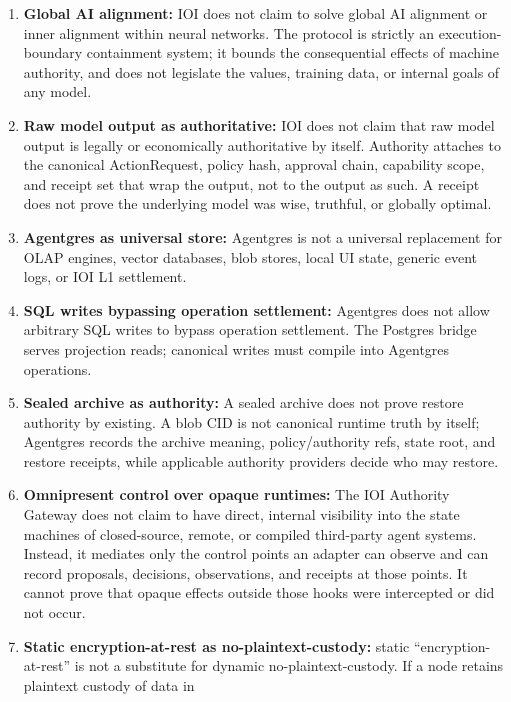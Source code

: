 \documentclass[
  11pt,
]{article}
\begin{document}
\begin{enumerate}
  misuse, or legal discovery risk. IOI's claim is narrower: the action's
  evidence posture, leakage bounds, and verifier requirements are
  explicit, auditable, and settlement-bound.
\item
  \textbf{Global AI alignment:} IOI does not claim to solve global AI
  alignment or inner alignment within neural networks. The protocol is
  strictly an execution-boundary containment system; it bounds the
  consequential effects of machine authority, and does not legislate the
  values, training data, or internal goals of any model.
\item
  \textbf{Raw model output as authoritative:} IOI does not claim that
  raw model output is legally or economically authoritative by itself.
  Authority attaches to the canonical ActionRequest, policy hash,
  approval chain, capability scope, and receipt set that wrap the
  output, not to the output as such. A receipt does not prove the
  underlying model was wise, truthful, or globally optimal.
\item
  \textbf{Agentgres as universal store:} Agentgres is not a universal
  replacement for OLAP engines, vector databases, blob stores, local UI
  state, generic event logs, or IOI L1 settlement.
\item
  \textbf{SQL writes bypassing operation settlement:} Agentgres does not
  allow arbitrary SQL writes to bypass operation settlement. The
  Postgres bridge serves projection reads; canonical writes must compile
  into Agentgres operations.
\item
  \textbf{Sealed archive as authority:} A sealed archive does not prove
  restore authority by existing. A blob CID is not canonical runtime
  truth by itself; Agentgres records the archive meaning, policy/authority
  refs, state root, and restore receipts, while applicable authority
  providers decide who may restore.
\item
  \textbf{Omnipresent control over opaque runtimes:} The IOI Authority
  Gateway does not claim to have direct, internal visibility into the
  state machines of closed-source, remote, or compiled third-party agent
  systems. Instead, it mediates only the control points an adapter can
  observe and can record proposals, decisions, observations, and receipts at
  those points. It cannot prove that opaque effects outside those hooks were
  intercepted or did not occur.
\item
  \textbf{Static encryption-at-rest as no-plaintext-custody:} static
  ``encryption-at-rest'' is not a substitute for dynamic
  no-plaintext-custody. If a node retains plaintext custody of data in

\end{enumerate}
\end{document}
